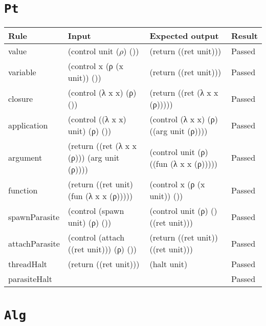 \documentclass[12pt,a4paper,twoside,openright]{report}
\begin{document}
\section{\texttt{Pt}}
\begin{tabular}{| p{3cm} | p{5cm} |  p{5cm} | p{1.5cm} |}
\hline
\textbf{Rule} & \textbf{Input} & \textbf{Expected output} & \textbf{Result} \\ \hline
value & (control unit ($\rho$) ()) & (return ((ret unit))) & Passed \\ \hline
variable & (control x (ρ (x unit)) ()) & (return ((ret unit))) & Passed \\ \hline
closure & (control (λ x x) (ρ) ()) & (return ((ret (λ x x (ρ))))) & Passed \\ \hline
application & (control ((λ x x) unit) (ρ) ()) & (control (λ x x) (ρ) ((arg unit (ρ)))) & Passed \\ \hline
argument & (return ((ret (λ x x (ρ))) (arg unit (ρ)))) & (control unit (ρ) ((fun (λ x x (ρ))))) & Passed \\ \hline
function & (return ((ret unit) (fun (λ x x (ρ))))) & (control x (ρ (x unit)) ()) & Passed \\ \hline
spawnParasite & (control (spawn unit) (ρ) ()) & (control unit (ρ) () ((ret unit))) & Passed \\ \hline
attachParasite & (control (attach ((ret unit))) (ρ) ()) & (return ((ret unit)) ((ret unit))) & Passed \\ \hline
threadHalt & (return ((ret unit))) & (halt unit) & Passed \\ \hline
parasiteHalt &   &  & Passed \\ \hline
\end{tabular}

\section{\texttt{Alg}}
\end{document}
